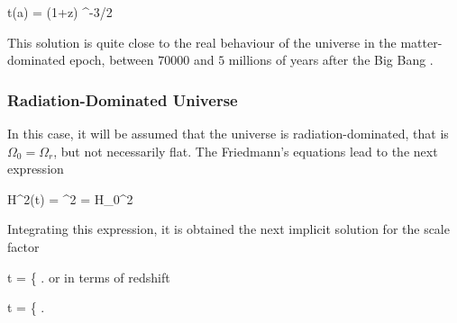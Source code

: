 { t(a) =  (1+z) ^{-3/2} }


This solution is quite close to the real behaviour of the universe in the 
matter-dominated epoch, between $70000$ and $5$ millions of years after 
the Big Bang \cite{padmanabhan1995}.



			\subsubsection*{Radiation-Dominated Universe}


In this case, it will be assumed that the universe is radiation-dominated, 
that is $\Omega_0 = \Omega_r$, but not necessarily flat. The Friedmann's 
equations lead to the next expression



{ H^2(t) = ^2 = H_0^2  }


Integrating this expression, it is obtained the next implicit solution for
the scale factor


{ t = \left\{   \right. }
or in terms of redshift



{ t = \left\{   \right. }


